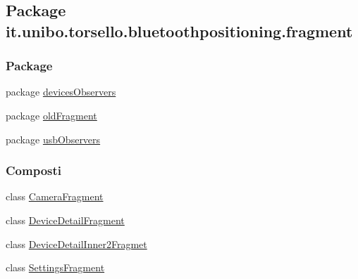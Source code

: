 \hypertarget{namespaceit_1_1unibo_1_1torsello_1_1bluetoothpositioning_1_1fragment}{}\subsection{Package it.\+unibo.\+torsello.\+bluetoothpositioning.\+fragment}
\label{namespaceit_1_1unibo_1_1torsello_1_1bluetoothpositioning_1_1fragment}
\subsubsection*{Package}
\begin{DoxyCompactItemize}
\item 
package \hyperlink{namespaceit_1_1unibo_1_1torsello_1_1bluetoothpositioning_1_1fragment_1_1devicesObservers}{devices\+Observers}
\item 
package \hyperlink{namespaceit_1_1unibo_1_1torsello_1_1bluetoothpositioning_1_1fragment_1_1oldFragment}{old\+Fragment}
\item 
package \hyperlink{namespaceit_1_1unibo_1_1torsello_1_1bluetoothpositioning_1_1fragment_1_1usbObservers}{usb\+Observers}
\end{DoxyCompactItemize}
\subsubsection*{Composti}
\begin{DoxyCompactItemize}
\item 
class \hyperlink{classit_1_1unibo_1_1torsello_1_1bluetoothpositioning_1_1fragment_1_1CameraFragment}{Camera\+Fragment}
\item 
class \hyperlink{classit_1_1unibo_1_1torsello_1_1bluetoothpositioning_1_1fragment_1_1DeviceDetailFragment}{Device\+Detail\+Fragment}
\item 
class \hyperlink{classit_1_1unibo_1_1torsello_1_1bluetoothpositioning_1_1fragment_1_1DeviceDetailInner2Fragmet}{Device\+Detail\+Inner2\+Fragmet}
\item 
class \hyperlink{classit_1_1unibo_1_1torsello_1_1bluetoothpositioning_1_1fragment_1_1SettingsFragment}{Settings\+Fragment}
\end{DoxyCompactItemize}

